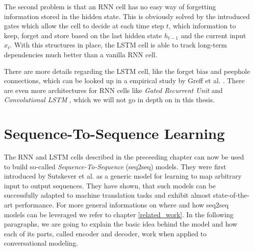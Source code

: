 The second problem is that an RNN cell has no easy way of forgetting information stored in the hidden state. This is obviously solved by the introduced gates which allow the cell to decide at each time step $t$, which information to keep, forget and store based on the last hidden state $h_{t-1}$ and the current input $x_t$. With this structures in place, the LSTM cell is able to track long-term dependencies much better than a vanilla RNN cell.

There are more details regarding the LSTM cell, like the forget bias and peephole connections, which can be looked up in a empirical study by Greff et al. \cite{Greff:2016}. There are even more architectures for RNN cells like \emph{Gated Recurrent Unit} \cite{Chung:2014} and \emph{Convolutional LSTM} \cite{Xingjian:2015}, which we will not go in depth on in this thesis.

\section{Sequence-To-Sequence Learning}
The RNN and LSTM cells described in the preceeding chapter can now be used to build so-called \emph{Sequence-To-Sequence} (seq2seq) models. They were first introduced by Sutskever et al. \cite{Sutskever:2014} as a generic model for learning to map arbitrary input to output sequences. They have shown, that such models can be successfully adapted to machine translation tasks and exhibit almost state-of-the-art performance. For more general informations on where and how seq2seq models can be leveraged we refer to chapter \ref{related_work}. In the following paragraphs, we are going to explain the basic idea behind the model and how each of its parts, called encoder and decoder, work when applied to conversational modeling.


